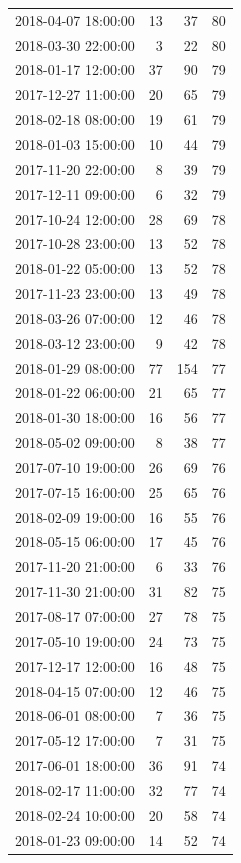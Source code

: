 \begin{tabular}{lrrr}
2018-04-07 18:00:00 & 13 & 37 & 80 \\
2018-03-30 22:00:00 & 3 & 22 & 80 \\
2018-01-17 12:00:00 & 37 & 90 & 79 \\
2017-12-27 11:00:00 & 20 & 65 & 79 \\
2018-02-18 08:00:00 & 19 & 61 & 79 \\
2018-01-03 15:00:00 & 10 & 44 & 79 \\
2017-11-20 22:00:00 & 8 & 39 & 79 \\
2017-12-11 09:00:00 & 6 & 32 & 79 \\
2017-10-24 12:00:00 & 28 & 69 & 78 \\
2017-10-28 23:00:00 & 13 & 52 & 78 \\
2018-01-22 05:00:00 & 13 & 52 & 78 \\
2017-11-23 23:00:00 & 13 & 49 & 78 \\
2018-03-26 07:00:00 & 12 & 46 & 78 \\
2018-03-12 23:00:00 & 9 & 42 & 78 \\
2018-01-29 08:00:00 & 77 & 154 & 77 \\
2018-01-22 06:00:00 & 21 & 65 & 77 \\
2018-01-30 18:00:00 & 16 & 56 & 77 \\
2018-05-02 09:00:00 & 8 & 38 & 77 \\
2017-07-10 19:00:00 & 26 & 69 & 76 \\
2017-07-15 16:00:00 & 25 & 65 & 76 \\
2018-02-09 19:00:00 & 16 & 55 & 76 \\
2018-05-15 06:00:00 & 17 & 45 & 76 \\
2017-11-20 21:00:00 & 6 & 33 & 76 \\
2017-11-30 21:00:00 & 31 & 82 & 75 \\
2017-08-17 07:00:00 & 27 & 78 & 75 \\
2017-05-10 19:00:00 & 24 & 73 & 75 \\
2017-12-17 12:00:00 & 16 & 48 & 75 \\
2018-04-15 07:00:00 & 12 & 46 & 75 \\
2018-06-01 08:00:00 & 7 & 36 & 75 \\
2017-05-12 17:00:00 & 7 & 31 & 75 \\
2017-06-01 18:00:00 & 36 & 91 & 74 \\
2018-02-17 11:00:00 & 32 & 77 & 74 \\
2018-02-24 10:00:00 & 20 & 58 & 74 \\
2018-01-23 09:00:00 & 14 & 52 & 74 \\

\end{tabular}
